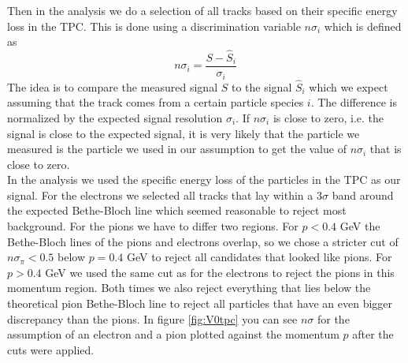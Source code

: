 Then in the analysis we do a selection of all tracks based on their specific energy loss in the TPC. This is done using a discrimination variable $n\sigma_i$ which is defined as
\begin{equation}
n\sigma_i = \frac{S-\hat{S}_i}{\sigma_i}
\end{equation}
The idea is to compare the measured signal $S$ to the signal $\hat{S}_i$ which we expect assuming that the track comes from a certain particle species $i$. The difference is normalized by the expected signal resolution $\sigma_i$. If $n\sigma_i$ is close to zero, i.e. the signal is close to the expected signal, it is very likely that the particle we measured is the particle we used in our assumption to get the value of $n\sigma_i$ that is close to zero. \\
In the analysis we used the specific energy loss of the particles in the TPC as our signal. For the electrons we selected all tracks that lay within a 3$\sigma$ band around the expected Bethe-Bloch line which seemed reasonable to reject most background. For the pions we have to differ two regions. For $p < 0.4$ GeV the Bethe-Bloch lines of the pions and electrons overlap, so we chose a stricter cut of $n\sigma_{\pi} < 0.5$ below $p = 0.4$ GeV to reject all candidates that looked like pions. For $p > 0.4$ GeV we used the same cut as for the electrons to reject the pions in this momentum region. Both times we also reject everything that lies below the theoretical pion Bethe-Bloch line to reject all particles that have an even bigger discrepancy than the pions. In figure \ref{fig:V0tpc} you can see $n\sigma$ for the assumption of an electron and a pion plotted against the momentum $p$ after the cuts were applied. \\
